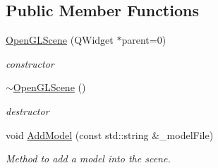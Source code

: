 \subsection*{Public Member Functions}
\begin{DoxyCompactItemize}
\item 
\hyperlink{classOpenGLScene_a22d3e62d9b562baf3f5cda3511a85578}{Open\+G\+L\+Scene} (Q\+Widget $\ast$parent=0)\hypertarget{classOpenGLScene_a22d3e62d9b562baf3f5cda3511a85578}{}\label{classOpenGLScene_a22d3e62d9b562baf3f5cda3511a85578}

\begin{DoxyCompactList}\small\item\em constructor \end{DoxyCompactList}\item 
\hyperlink{classOpenGLScene_a9e3b2533ed475dd7b7c103d5545c8636}{$\sim$\+Open\+G\+L\+Scene} ()\hypertarget{classOpenGLScene_a9e3b2533ed475dd7b7c103d5545c8636}{}\label{classOpenGLScene_a9e3b2533ed475dd7b7c103d5545c8636}

\begin{DoxyCompactList}\small\item\em destructor \end{DoxyCompactList}\item 
void \hyperlink{classOpenGLScene_a0a467aa89ded05ecd0a5daf355f7f345}{Add\+Model} (const std\+::string \&\+\_\+model\+File)
\begin{DoxyCompactList}\small\item\em Method to add a model into the scene. \end{DoxyCompactList}\end{DoxyCompactItemize}
